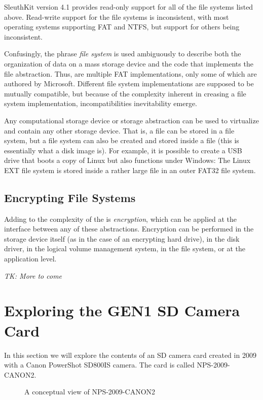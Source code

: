 SleuthKit version 4.1 provides read-only support for all of the file
systems listed above. Read-write support for the file systems is
inconsistent, with most operating systems supporting FAT and NTFS,
but support for others being inconsistent.

Confusingly, the phrase \emph{file system} is used ambiguously to
describe both the organization of data on a mass storage device and
the code that implements the file abstraction. Thus, are multiple FAT
implementations, only some of which are authored by
Microsoft. Different file system implementations are supposed to be
mutually compatible, but because of the complexity inherent in
creasing a file system implementation, incompatibilities inevitability
emerge.

Any computational storage device or storage abstraction can be used to
virtualize and contain any other storage device. That is, a file can
be stored in a file system, but a file system can also be created and
stored inside a file (this is essentially what a disk image is). For
example, it is possible to create a USB drive that boots a copy of
Linux but also functions under Windows: The Linux EXT file system is
stored inside a rather large file in an outer FAT32 file system.

\subsection{Encrypting File Systems}

Adding to the complexity of the is \emph{encryption}, which can be
applied at the interface between any of these abstractions. Encryption
can be performed in the storage device itself (as in the case of an
encrypting hard drive), in the disk driver, in the logical volume
management system, in the file system, or at the application level.

\emph{TK: More to come}


\section{Exploring the GEN1 SD Camera Card}
In this section we will explore the contents of an SD camera card
created in 2009 with a Canon PowerShot SD800IS camera. The card is called NPS-2009-CANON2.

\begin{figure}
\caption{A conceptual view of NPS-2009-CANON2\label{nps-2009-canon2-conceptual}}
\end{figure}

